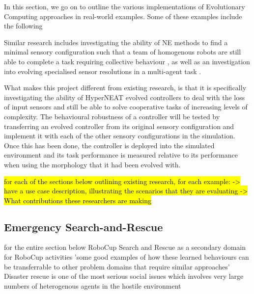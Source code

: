 In this section, we go on to outline the various implementations of Evolutionary Computing approaches in real-world examples. Some of these examples include the following


Similar research includes investigating the ability of NE methods to find a minimal sensory configuration such that a team of homogenous robots are still able to complete a task requiring collective behaviour \cite{WatsonNitschke2015CEC}, as well as an investigation into evolving specialised sensor resolutions in a multi-agent task \cite{NitschkeSchutEiben2010}.


What makes this project different from existing research, is that it is specifically investigating the ability of HyperNEAT evolved controllers to deal with the loss of input sensors and still be able to solve cooperative tasks of increasing levels of complexity.
The behavioural robustness of a controller will be tested by transferring an evolved controller from its original sensory configuration and implement it with each of the other sensory configurations in the simulation. Once this has been done, the controller is deployed into the simulated environment and its task performance is measured relative to its performance when using the morphology that it had been evolved with.

\hl{for each of the sections below outlining existing research, for each example:
-> have a use case description, illustrating the scenarios that they are evaluating
-> What contributions these researchers are making}


\subsection{Emergency Search-and-Rescue}

\cite{KitanoTadokoro1999} for the entire section below
RoboCup Search and Rescue as a secondary domain for RoboCup activities
'some good examples of how these learned behaviours can be transferrable to other problem domains that require similar approaches'
Disaster rescue is one of the most serious social issues which involves very large numbers of heterogenous agents in the hostile environment

